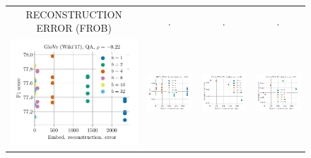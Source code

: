 \begin{figure}
\begin{tabular}{@{\hskip -0.0in}c@{\hskip -0.0in}c@{\hskip -0.0in}c@{\hskip -0.0in}c@{\hskip -0.0in}}
		
		RECONSTRUCTION ERROR (FROB) & . & . & . \\		
		\includegraphics[width=.245\linewidth]{figures/glove-wiki400k-am_qa_best-f1_vs_embed-frob-error_linx.pdf} &
		\includegraphics[width=.245\linewidth]{figures/glove-wiki400k-am_sentiment_trec_test-acc_vs_embed-frob-error_linx.pdf} &
		\includegraphics[width=.245\linewidth]{figures/glove-wiki400k-am_intrinsics_analogy-avg-score_vs_embed-frob-error_linx.pdf} &
		\includegraphics[width=.245\linewidth]{figures/glove-wiki400k-am_intrinsics_similarity-avg-score_vs_embed-frob-error_linx.pdf} \\
		

\end{tabular}
\end{figure}
